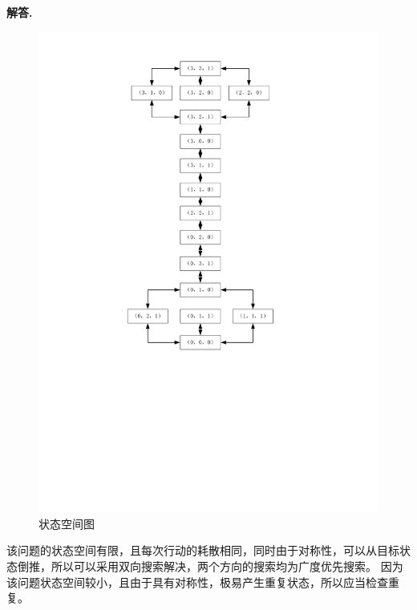 \documentclass[12pt, a4paper, oneside]{ctexart}
\newenvironment{solution}{\par\noindent\textbf{解答. }}{\\\par}
\begin{document}
\begin{solution}
\newpage
\begin{figure}
    \centering
    \includegraphics[scale = 0.8]{绘图1.pdf}
\caption{状态空间图}
\end{figure}
该问题的状态空间有限，且每次行动的耗散相同，同时由于对称性，可以从目标状态倒推，所以可以采用双向搜索解决，两个方向的搜索均为广度优先搜索。
因为该问题状态空间较小，且由于具有对称性，极易产生重复状态，所以应当检查重复。


\end{solution}
\end{document}
